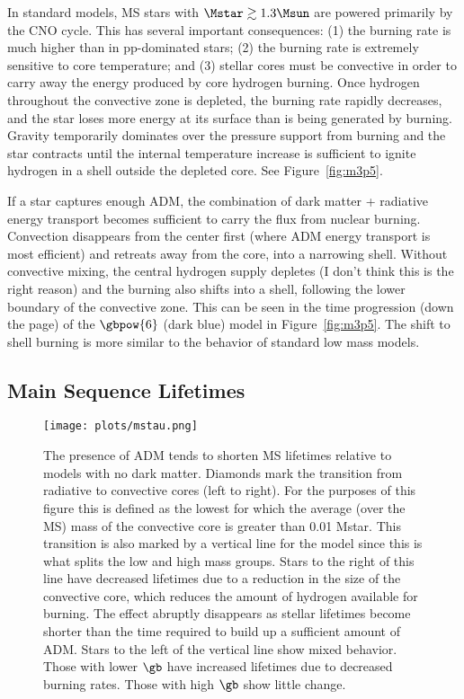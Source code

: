 In standard models, MS stars with $\Mstar \gtrsim 1.3 \Msun$ are powered primarily by the CNO cycle.
This has several important consequences:
(1) the burning rate is much higher than in pp-dominated stars;
(2) the burning rate is extremely sensitive to core temperature;
and (3) stellar cores must be convective in order to carry away the energy produced by core hydrogen burning.
Once hydrogen throughout the convective zone is depleted, the burning rate rapidly decreases, and the star loses more energy at its surface than is being generated by burning. Gravity temporarily dominates over the pressure support from burning and the star contracts until the internal temperature increase is sufficient to ignite hydrogen in a shell outside the depleted core. See Figure~\ref{fig:m3p5}.

If a star captures enough ADM, the combination of dark matter + radiative energy transport becomes sufficient to carry the flux from nuclear burning. Convection disappears from the center first (where ADM energy transport is most efficient) and retreats away from the core, into a narrowing shell. Without convective mixing, the central hydrogen supply depletes (I don't think this is the right reason) and the burning also shifts into a shell, following the lower boundary of the convective zone. This can be seen in the time progression (down the page) of the $\gbpow{6}$ (dark blue) model in Figure~\ref{fig:m3p5}. The shift to shell burning is more similar to the behavior of standard low mass models.


\subsection{Main Sequence Lifetimes}
\label{sub:mstau}

\begin{figure*}
  \centering
  \texttt{[image: plots/mstau.png]}
  \caption{The presence of ADM tends to shorten MS lifetimes relative to models with no dark matter.
  Diamonds mark the transition from radiative to convective cores (left to right). For the purposes of this figure this is defined as the lowest \Mstar for which the average (over the MS) mass of the convective core is greater than 0.01 Mstar. This transition is also marked by a vertical line for the \nodm model since this is what splits the low and high mass groups. Stars to the right of this line have decreased lifetimes due to a reduction in the size of the convective core, which reduces the amount of hydrogen available for burning. The effect abruptly disappears as stellar lifetimes become shorter than the time required to build up a sufficient amount of ADM. Stars to the left of the vertical line show mixed behavior. Those with lower $\gb$ have increased lifetimes due to decreased burning rates. Those with high $\gb$ show little change.
  }
  \label{fig:mstau}
\end{figure*}

